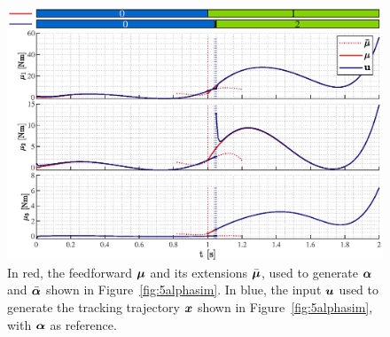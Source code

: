 \documentclass[../DC2019003Bouma.tex]{subfiles}
\begin{document}
\begin{figure}[bt!]
\centering
\begin{minipage}[c]{\textwidth}
\centering
\includegraphics[width=\textwidth]{muu.eps}
\end{minipage}
\caption{In red, the feedforward $\boldsymbol{\mu}$ and its extensions $\bar{\boldsymbol{\mu}}$, used to generate $\boldsymbol{\alpha}$ and $\bar{\boldsymbol{\alpha}}$ shown in Figure~\ref{fig:5alphasim}. In blue, the input ${\boldsymbol{u}}$ used to generate the tracking trajectory ${\boldsymbol{x}}$ shown in Figure~\ref{fig:5alphasim}, with $\boldsymbol{\alpha}$ as reference.}\label{fig:5musim}
\end{figure}
\end{document}
